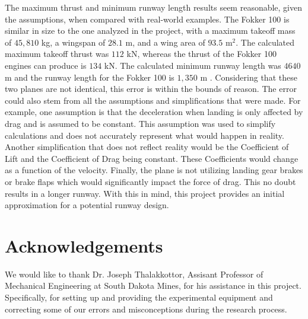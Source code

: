 \documentclass[
	12pt, %
]{fluids_report_style}
\begin{document}
\noindent The maximum thrust and minimum runway length results seem reasonable, given the assumptions, when compared with real-world examples. The Fokker 100 is similar in size to the one analyzed in the project, with a maximum takeoff mass of $45,810$ kg, a wingspan of $28.1$ m, and a wing area of $93.5$ m$^2$. The calculated maximum takeoff thrust was $112$ kN, whereas the thrust of the Fokker 100 engines can produce is $134$ kN. The calculated minimum runway length was $4640$m and the runway length for the Fokker 100 is $1,350$ m \cite{burger_2018}. Considering that these two planes are not identical, this error is within the bounds of reason. The error could also stem from all the assumptions and simplifications that were made. For example, one assumption is that the deceleration when landing is only affected by drag and is assumed to be constant. This assumption was used to simplify calculations and does not accurately represent what would happen in reality. Another simplification that does not reflect reality would be the Coefficient of Lift and the Coefficient of Drag being constant. These Coefficients would change as a function of the velocity. Finally, the plane is not utilizing landing gear brakes or brake flaps which would significantly impact the force of drag. This no doubt results in a longer runway. With this in mind, this project provides an initial approximation for a potential runway design.


\section{Acknowledgements}
We would like to thank Dr. Joseph Thalakkottor, Assisant Professor of Mechanical Engineering at South Dakota Mines, for his assistance in this project. Specifically, for setting up and providing the experimental equipment and correcting some of our errors and misconceptions during the research process.

\par
\bigskip

\newpage
{}   %
\printbibliography[heading=bibintoc, title={References}]

\end{document}
